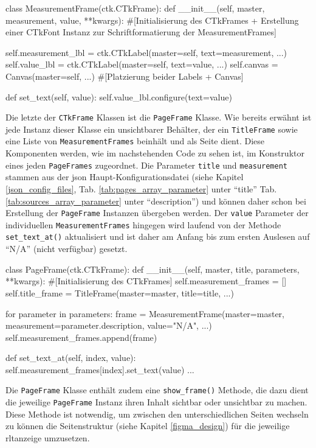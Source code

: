 \begin{pythoncode}
class MeasurementFrame(ctk.CTkFrame):
	def __init__(self, master, measurement, value, **kwargs):
		#[Initialisierung des CTkFrames + Erstellung einer CTkFont Instanz zur Schriftformatierung der MeasurementFrames]
		
		self.measurement_lbl = ctk.CTkLabel(master=self, text=measurement, ...)
		self.value_lbl = ctk.CTkLabel(master=self, text=value, ...)
		self.canvas = Canvas(master=self, ...)
		#[Platzierung beider Labels + Canvas]
		
	def set_text(self, value):
		self.value_lbl.configure(text=value)
\end{pythoncode}

Die letzte der \lstinline{CTkFrame} Klassen ist die \lstinline{PageFrame} Klasse. Wie bereits erwähnt ist jede Instanz dieser Klasse ein unsichtbarer Behälter, der ein \lstinline{TitleFrame} sowie eine Liste von \lstinline{MeasurementFrames} beinhält und als Seite dient. Diese Komponenten werden, wie im nachstehenden Code zu sehen ist, im Konstruktor eines jeden \lstinline{PageFrames} zugeordnet. Die Parameter \lstinline{title} und \lstinline{measurement} stammen aus der \acs{json} Haupt-Konfigurationsdatei (siehe Kapitel \ref{json_config_files}, Tab. \ref{tab:pages_array_parameter} unter \enquote{title} \bzw Tab. \ref{tab:sources_array_parameter}  unter \enquote{description}) und können daher schon bei Erstellung der \lstinline{PageFrame} Instanzen übergeben werden. Der \lstinline{value} Parameter der individuellen \lstinline{MeasurementFrames} hingegen wird laufend von der Methode \lstinline{set_text_at()} aktualisiert und ist daher am Anfang bis zum ersten Auslesen auf \enquote{N/A} (\dt nicht verfügbar) gesetzt.
	
\begin{pythoncode}
class PageFrame(ctk.CTkFrame):
	def __init__(self, master, title, parameters, **kwargs):
		#[Initialisierung des CTkFrames]
		self.measurement_frames = []
		self.title_frame = TitleFrame(master=master, title=title, ...)
		
		for parameter in parameters:
			frame = MeasurementFrame(master=master, measurement=parameter.description, value="N/A", ...)
			self.measurement_frames.append(frame)

    def set_text_at(self, index, value):
        self.measurement_frames[index].set_text(value)
...
\end{pythoncode}

Die \lstinline{PageFrame} Klasse enthält zudem eine \lstinline{show_frame()} Methode, die dazu dient die jeweilige \lstinline{PageFrame} Instanz \bzw ihren Inhalt sichtbar oder unsichtbar zu machen. Diese Methode ist notwendig, um zwischen den unterschiedlichen Seiten wechseln zu können \bzw die Seitenstruktur (siehe Kapitel \ref{figma_design}) für die jeweilige \acs{rltanzeige} umzusetzen.

